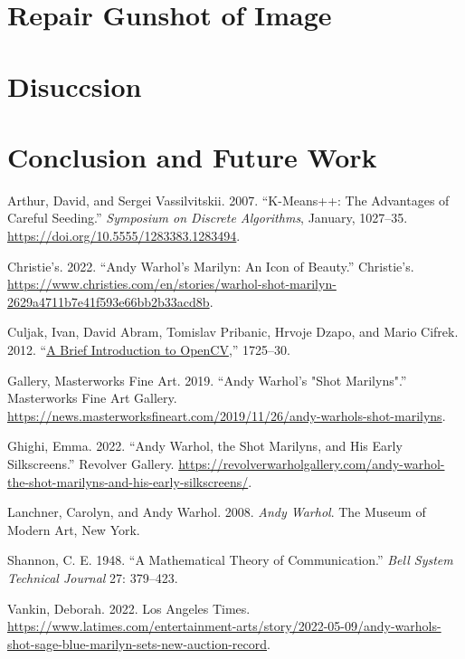 \documentclass{article}
\newlength{\cslhangindent}
\newlength{\cslentryspacingunit} %
\newenvironment{CSLReferences}[2] %
 {%
  \setlength{\parindent}{0pt}
  \ifodd #1
  \let\oldpar\par
  \def\par{\hangindent=\cslhangindent\oldpar}
  \fi
  \setlength{\parskip}{#2\cslentryspacingunit}
 }%
 {}
\begin{document}
\hypertarget{repair-gunshot-of-image}{%
\section{Repair Gunshot of Image}\label{repair-gunshot-of-image}}

\hypertarget{disuccsion}{%
\section{Disuccsion}\label{disuccsion}}

\hypertarget{conclusion-and-future-work}{%
\section*{Conclusion and Future Work}\label{conclusion-and-future-work}}

\hypertarget{refs}{}
\begin{CSLReferences}{1}{0}
\leavevmode{}%
Arthur, David, and Sergei Vassilvitskii. 2007. {``K-Means++: The
Advantages of Careful Seeding.''} \emph{Symposium on Discrete
Algorithms}, January, 1027--35.
\url{https://doi.org/10.5555/1283383.1283494}.

\leavevmode{}%
Christie's. 2022. {``Andy Warhol's Marilyn: An Icon of Beauty.''}
Christie's.
\url{https://www.christies.com/en/stories/warhol-shot-marilyn-2629a4711b7e41f593e66bb2b33acd8b}.

\leavevmode{}%
Culjak, Ivan, David Abram, Tomislav Pribanic, Hrvoje Dzapo, and Mario
Cifrek. 2012. {``\href{}{A Brief Introduction to OpenCV},''} 1725--30.

\leavevmode{}%
Gallery, Masterworks Fine Art. 2019. {``Andy Warhol's "Shot
Marilyns".''} Masterworks Fine Art Gallery.
\url{https://news.masterworksfineart.com/2019/11/26/andy-warhols-shot-marilyns}.

\leavevmode{}%
Ghighi, Emma. 2022. {``Andy Warhol, the Shot Marilyns, and His Early
Silkscreens.''} Revolver Gallery.
\url{https://revolverwarholgallery.com/andy-warhol-the-shot-marilyns-and-his-early-silkscreens/}.

\leavevmode{}%
Lanchner, Carolyn, and Andy Warhol. 2008. \emph{Andy Warhol}. The Museum
of Modern Art, New York.

\leavevmode{}%
Shannon, C. E. 1948. {``A Mathematical Theory of Communication.''}
\emph{Bell System Technical Journal} 27: 379--423.

\leavevmode{}%
Vankin, Deborah. 2022. Los Angeles Times.
\url{https://www.latimes.com/entertainment-arts/story/2022-05-09/andy-warhols-shot-sage-blue-marilyn-sets-new-auction-record}.

\end{CSLReferences}



\end{document}
